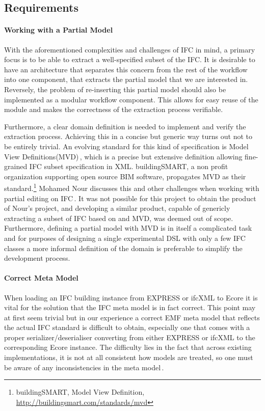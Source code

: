 \subsection{Requirements}
\label{subsec:requirements}
\paragraph{Working with a Partial Model}
With the aforementioned complexities and challenges of IFC in mind, a primary focus is to be able to extract a well-specified subset of the IFC. It is desirable to have an architecture that separates this concern from the rest of the workflow into one component, that extracts the partial model that we are interested in. Reversely, the problem of re-inserting this partial model should also be implemented as a modular workflow component. This allows for easy reuse of the module and makes the correctness of the extraction process verifiable.

Furthermore, a clear domain definition is needed to implement and verify the extraction process. Achieving this in a concise but generic way turns out not to be entirely trivial. An evolving standard for this kind of specification is Model View Definitions(MVD)\,\cite{nour08}, which is a precise but extensive definition allowing fine-grained IFC subset specification in XML. buildingSMART, a non profit organization supporting open source BIM software, propagates MVD as their standard.\footnote{buildingSMART, Model View Definition, \url{http://buildingsmart.com/standards/mvd}} Mohamed Nour discusses this and other challenges when working with partial editing on IFC\,\cite{nour08}. It was not possible for this project to obtain the product of Nour's project, and developing a similar product, capable of genericly extracting a subset of IFC based on and MVD, was deemed out of scope. Furthermore, defining a partial model with MVD is in itself a complicated task and for purposes of designing a single experimental DSL with only a few IFC classes a more informal definition of the domain is preferable to simplify the development process.

\paragraph{Correct Meta Model}
When loading an IFC building instance from EXPRESS or ifcXML to Ecore it is vital for the solution that the IFC meta model is in fact correct. This point may at first seem trivial but in our experience a correct EMF meta model that reflects the actual IFC standard is difficult to obtain, especially one that comes with a proper serializer/deserialiser converting from either EXPRESS or ifcXML to the corresponding Ecore instance. The difficulty lies in the fact that across existing implementations, it is not at all consistent how models are treated, so one must be aware of any inconsistencies in the meta model\,\cite[pp. 4]{quteprints37725}. %

